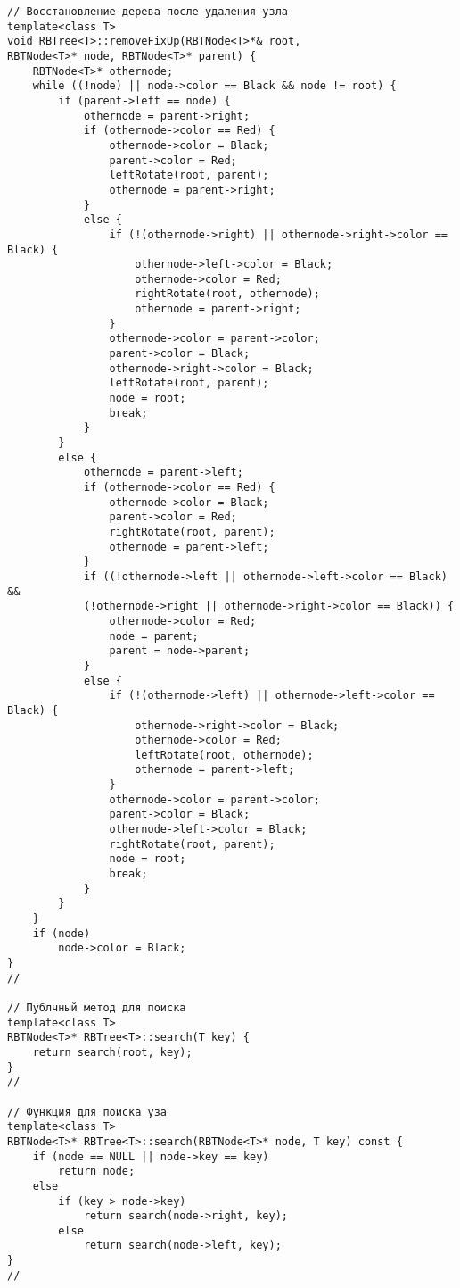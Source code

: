\documentclass[bachelor, och, referat, times]{SCWorks}
\begin{document}
\begin{verbatim}
// Восстановление дерева после удаления узла
template<class T>
void RBTree<T>::removeFixUp(RBTNode<T>*& root, 
RBTNode<T>* node, RBTNode<T>* parent) {
    RBTNode<T>* othernode;
    while ((!node) || node->color == Black && node != root) {
        if (parent->left == node) {
            othernode = parent->right;
            if (othernode->color == Red) {
                othernode->color = Black;
                parent->color = Red;
                leftRotate(root, parent);
                othernode = parent->right;
            }
            else {
                if (!(othernode->right) || othernode->right->color == Black) {
                    othernode->left->color = Black;
                    othernode->color = Red;
                    rightRotate(root, othernode);
                    othernode = parent->right;
                }
                othernode->color = parent->color;
                parent->color = Black;
                othernode->right->color = Black;
                leftRotate(root, parent);
                node = root;
                break;
            }
        }
        else {
            othernode = parent->left;
            if (othernode->color == Red) {
                othernode->color = Black;
                parent->color = Red;
                rightRotate(root, parent);
                othernode = parent->left;
            }
            if ((!othernode->left || othernode->left->color == Black) && 
            (!othernode->right || othernode->right->color == Black)) {
                othernode->color = Red;
                node = parent;
                parent = node->parent;
            }
            else {
                if (!(othernode->left) || othernode->left->color == Black) {
                    othernode->right->color = Black;
                    othernode->color = Red;
                    leftRotate(root, othernode);
                    othernode = parent->left;
                }
                othernode->color = parent->color;
                parent->color = Black;
                othernode->left->color = Black;
                rightRotate(root, parent);
                node = root;
                break;
            }
        }
    }
    if (node)
        node->color = Black;
}
//

// Публчный метод для поиска
template<class T>
RBTNode<T>* RBTree<T>::search(T key) {
    return search(root, key);
}
//

// Функция для поиска уза
template<class T>
RBTNode<T>* RBTree<T>::search(RBTNode<T>* node, T key) const {
    if (node == NULL || node->key == key)
        return node;
    else
        if (key > node->key)
            return search(node->right, key);
        else
            return search(node->left, key);
}
//


\end{verbatim}
\end{document}
